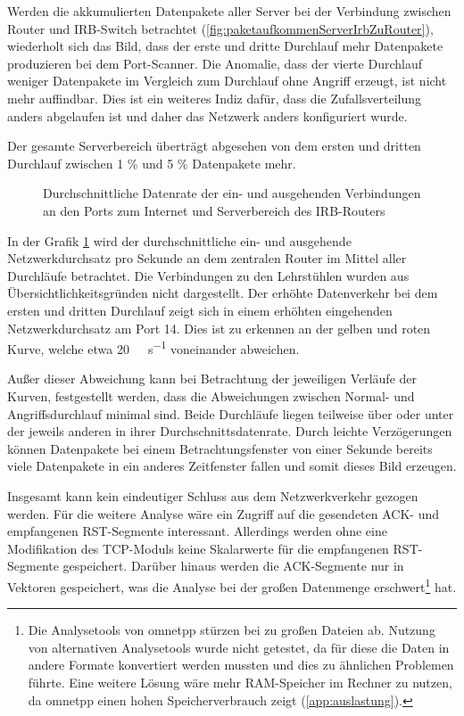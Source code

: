Werden die akkumulierten Datenpakete aller Server bei der Verbindung zwischen Router und IRB-Switch betrachtet (\ref{fig:paketaufkommenServerIrbZuRouter}), wiederholt sich das Bild, dass der erste und dritte Durchlauf mehr Datenpakete produzieren bei dem Port-Scanner. Die Anomalie, dass der vierte Durchlauf weniger Datenpakete im Vergleich zum Durchlauf ohne Angriff erzeugt, ist nicht mehr auffindbar. Dies ist ein weiteres Indiz dafür, dass die Zufallsverteilung anders abgelaufen ist und daher das Netzwerk anders konfiguriert wurde. 

Der gesamte Serverbereich überträgt abgesehen von dem ersten und dritten Durchlauf zwischen 1 \% und 5 \% Datenpakete mehr. 

\begin{figure}[ht]
	\centering
	
	\caption[Durchschnittliche Datenrate am IRB-Router]{Durchschnittliche Datenrate der ein- und ausgehenden Verbindungen an den Ports zum Internet und Serverbereich des IRB-Routers}  
	\label{fig:portPaketAufkommenIrbRouter}
\end{figure}

In der Grafik \ref{fig:portPaketAufkommenIrbRouter} wird der durchschnittliche ein- und ausgehende Netzwerkdurchsatz pro Sekunde an dem zentralen Router im Mittel aller Durchläufe betrachtet. Die Verbindungen zu den Lehrstühlen wurden aus Übersichtlichkeitsgründen nicht dargestellt. Der erhöhte Datenverkehr bei dem ersten und dritten Durchlauf zeigt sich in einem erhöhten eingehenden Netzwerkdurchsatz am Port 14. Dies ist zu erkennen an der gelben und roten Kurve, welche etwa  \SI{20}{\mega\bit\per\second} voneinander abweichen.

Außer dieser Abweichung kann bei Betrachtung der jeweiligen Verläufe der Kurven,  festgestellt werden, dass die Abweichungen zwischen Normal- und Angriffsdurchlauf minimal sind. Beide Durchläufe liegen teilweise über oder unter der jeweils anderen in ihrer Durchschnittsdatenrate. Durch leichte Verzögerungen können Datenpakete bei einem Betrachtungsfenster von einer Sekunde bereits viele Datenpakete in ein anderes Zeitfenster fallen und somit dieses Bild erzeugen. 

Insgesamt kann kein eindeutiger Schluss aus dem Netzwerkverkehr gezogen werden. Für die weitere Analyse wäre ein Zugriff auf die gesendeten ACK- und empfangenen RST-Segmente interessant. Allerdings werden ohne eine Modifikation des TCP-Moduls keine Skalarwerte für die empfangenen RST-Segmente gespeichert. Darüber hinaus werden die ACK-Segmente nur in Vektoren gespeichert, was die Analyse bei der großen Datenmenge erschwert\footnote{Die Analysetools von \gls{omnetpp} stürzen bei zu großen Dateien ab. Nutzung von alternativen Analysetools wurde nicht getestet, da für diese die Daten in andere Formate konvertiert werden mussten und dies zu ähnlichen Problemen führte. Eine weitere Lösung wäre mehr RAM-Speicher im Rechner zu nutzen, da \gls{omnetpp} einen hohen Speicherverbrauch zeigt (\ref{app:auslastung}).} hat.


